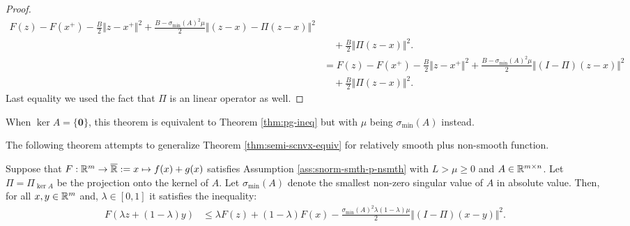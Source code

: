 \documentclass[12pt]{article}
\begin{document}
\begin{proof}
\begin{align*}
                    F(z) - F(x^+)
                    - \frac{B}{2}\Vert z - x^+\Vert^2 
                    + \frac{B - \sigma_{\min}(A)^2\mu}{2}\Vert (z - x) - \Pi(z - x) \Vert^2
                        \\ &\quad 
                        + \frac{B}{2}\Vert \Pi(z - x)\Vert^2. 
                    \\
                    &= 
                    F(z) - F(x^+)
                    - \frac{B}{2}\Vert z - x^+\Vert^2 
                    + \frac{B - \sigma_{\min}(A)^2\mu}{2}\Vert (I - \Pi)(z - x) \Vert^2
                        \\ &\quad 
                        + \frac{B}{2}\Vert \Pi(z - x)\Vert^2. 
                \end{align*}
                Last equality we used the fact that $\Pi$ is an linear operator as well. 
            \end{proof}
            \begin{remark}
                When $\ker A = \{\mathbf 0\}$, this theorem is equivalent to Theorem \ref{thm:pg-ineq} but with $\mu$ being $\sigma_{\min}(A)$ instead. 
            \end{remark}
            The following theorem attempts to generalize Theorem \ref{thm:semi-scnvx-equiv} for relatively smooth plus non-smooth function. 
            \begin{theorem}\label{thm:smnrm-jnsn-smth-nsmth}
                Suppose that $F:\mathbb R^m \rightarrow \overline {\mathbb R} := x \mapsto f(x) + g(x)$ satisfies Assumption \ref{ass:snorm-smth-p-nsmth} with $L > \mu \ge 0$ and $A \in \mathbb R^{m\times n}$.
                Let $\Pi = \Pi_{\ker A}$ be the projection onto the kernel of $A$. 
                Let $\sigma_{\min}(A)$ denote the smallest non-zero singular value of $A$ in absolute value. 
                Then, for all $x, y \in \mathbb R^m$ and, $\lambda \in [0, 1]$ it satisfies the inequality: 
                \begin{align*}
                    F(\lambda z + (1 - \lambda)y) &\le \lambda F(z) + (1 - \lambda)F(x) - \frac{\sigma_{\min}(A)^2\lambda(1 - \lambda)\mu}{2}\Vert (I - \Pi)(x - y)\Vert^2. 
                \end{align*}
            \end{theorem}
\end{document}
